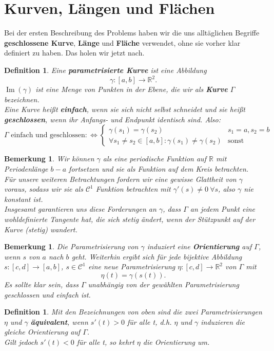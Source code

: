 \documentclass[12pt,a4paper]{article}
\theoremstyle{plain}
\newtheorem{Definition}[Theorem]{Definition}
\newtheorem{Bemerkung}[Theorem]{Bemerkung}
\newcommand{\herv}[1]{{\emph{\textbf{#1}}}}
\newcommand{\R}{\mathbb{R}}
\numberwithin{equation}{section}
\begin{document}
\section{Kurven, Längen und Flächen}
Bei der ersten Beschreibung des Problems haben wir die uns alltäglichen Begriffe \textbf{geschlossene Kurve}, \textbf{Länge} und \textbf{Fläche} verwendet, ohne sie vorher klar definiert zu haben. Das holen wir jetzt nach.
\begin{Definition}
Eine \herv{parametrisierte Kurve} ist eine Abbildung \[ \gamma:[a,b] \rightarrow \R^2 .\]
$\operatorname{Im}(\gamma)$ ist eine Menge von Punkten in der Ebene, die wir als \herv{Kurve} $\Gamma$ bezeichnen.\\
Eine Kurve heißt \herv{einfach}, wenn sie sich nicht selbst schneidet und sie heißt \herv{geschlossen}, wenn ihr Anfangs- und Endpunkt identisch sind. Also:
\[ \Gamma \text{ einfach und geschlossen} :\Leftrightarrow \left\lbrace \begin{array}{ll}
\gamma(s_1)=\gamma(s_2)& s_1=a, s_2=b  \\ \forall s_1\neq s_2 \in [a,b]:  \gamma(s_1)\neq \gamma(s_2) & \text{sonst} \end{array}\right. \]
\end{Definition}
\begin{Bemerkung}
Wir können $\gamma$ als eine periodische Funktion auf $\R$ mit Periodenlänge $b-a$ fortsetzen und sie als Funktion auf dem Kreis betrachten.\\
Für unsere weiteren Betrachtungen fordern wir eine gewisse Glattheit von $\gamma$ voraus, sodass wir sie als $\mathcal{C}^1$ Funktion betrachten mit $\gamma'(s)\neq 0\ \forall s$, also $\gamma$ nie konstant ist. \\
Insgesamt garantieren uns diese Forderungen an $\gamma$, dass $\Gamma$ an jedem Punkt eine wohldefinierte Tangente hat, die sich stetig ändert, wenn der Stützpunkt auf der Kurve (stetig) wandert.
\end{Bemerkung}
\begin{Bemerkung}
Die Parametrisierung von $\gamma$ induziert eine \textbf{Orientierung} auf $\Gamma$, wenn $s$ von $a$ nach $b$ geht. Weiterhin ergibt sich für jede bijektive Abbildung $s: [c,d] \rightarrow [a,b]$, $s\in \mathcal{C}^1$ eine neue Parametrisierung $\eta:[c,d] \rightarrow \R^2$ von $\Gamma$ mit \[ \eta(t) = \gamma(s(t)).\]
Es sollte klar sein, dass $\Gamma$ unabhängig von der gewählten Parametrisierung  geschlossen und einfach ist.
\end{Bemerkung}
\begin{Definition}
Mit den Bezeichnungen von oben sind die zwei Parametrisierungen $\eta$ und $\gamma$ \herv{äquivalent}, wenn $s'(t)>0$ für alle t, d.h. $\eta$ und $\gamma$ induzieren die gleiche Orientierung auf $\Gamma$.\\
Gilt jedoch $s'(t)<0$ für alle t, so kehrt $\eta$ die Orientierung um.
\end{Definition}
\end{document}

